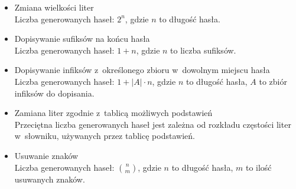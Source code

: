 \begin{itemize}

    \item
        Zmiana wielkości liter \\
        Liczba generowanych haseł: $2^n$, gdzie $n$ to długość hasła.
        

        

    \item
        Dopisywanie sufiksów na końcu hasła \\
        Liczba generowanych haseł: $1+n$, gdzie $n$ to liczba sufiksów.

        

        

    \item
        Dopisywanie infiksów z~określonego zbioru w~dowolnym miejscu hasła \\
        Liczba generowanych haseł: $1 + |A| \cdot n$, gdzie $n$ to długość
        hasła, $A$ to zbiór infiksów do dopisania.

        

        

    \item
        Zamiana liter zgodnie z~tablicą możliwych podstawień \\
        Przeciętna liczba generowanych haseł jest zależna od rozkładu częstości
        liter w~słowniku, używanych przez tablicę podstawień.

        

        

    \item
        Usuwanie znaków \\
        Liczba generowanych haseł: $n \choose m$, gdzie $n$ to długość hasła,
        $m$ to ilość usuwanych znaków.


\end{itemize}
